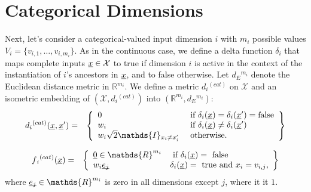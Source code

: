 \documentclass[letterpaper]{article}
\newcommand{\vect}[1]{\underline{\smash{#1}}}
\renewcommand{\v}[1]{\vect{#1}}
\newcommand{\reals}{\mathds{R}}
\newcommand{\sX}{\mathcal{X}}
\newcommand{\indicator}{\ensuremath\mathds{I}}
\begin{document}
\section{Categorical Dimensions}

Next, let's consider a categorical-valued input dimension $i$ with $m_i$ possible values $V_i = \{v_{i,1}, \dots, v_{i,m_i}\}$. As in the continuous case, we define a delta function $\delta_i$ that maps complete inputs $\v{x} \in \sX$ to true if dimension $i$ is active in the context of the instantiation of $i$'s ancestors in $\v{x}$, and to false otherwise. Let $d{_E}^{m_i}$ denote the Euclidean distance metric in $\reals^{m_i}$. We define a metric $d{_i}^{(cat)}$ on $\sX$ and an isometric embedding of $(\sX, d{_i}^{(cat)})$ into $(\reals^{m_i},d{_E}^{m_i})$:
\begin{eqnarray}
\nonumber{}d{_i}^{(cat)}(\v{x}, \v{x}') & = & \left\{\begin{array}{ll}
\nonumber{} 0 & \textrm{ if } \delta_i(\v{x}) = \delta_i(\v{x}') = \textrm{false}\\
\nonumber{} w_i & \textrm{ if } \delta_i(\v{x}) \neq \delta_i(\v{x}')\\
\nonumber{} w_i \sqrt{2} \indicator_{x_i \neq x_i'} & \textrm{ otherwise. }\end{array}\right\}
\end{eqnarray}

\begin{eqnarray}
\nonumber{}f{_i}^{(cat)}(\v{x}) & = & \left\{\begin{array}{ll}
\v{0} \in \reals^{m_i} & \textrm{ if } \delta_i(\v{x}) = \textrm{ false }\\
\nonumber{} w_i \v{e_j} & \delta_i(\v{x}) = \textrm{ true and } x_i = v_{i,j},
\end{array}\right\}
\end{eqnarray}
\noindent{}where $\v{e_j} \in \reals^{m_i}$ is zero in all dimensions except $j$, where it it $1$.
\end{document}
